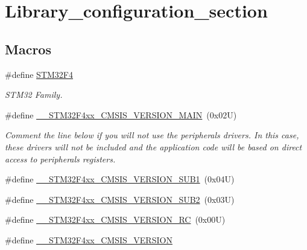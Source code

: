 \hypertarget{group___library__configuration__section}{}\section{Library\+\_\+configuration\+\_\+section}
\label{group___library__configuration__section}
\subsection*{Macros}
\begin{DoxyCompactItemize}
\item 
\#define \hyperlink{group___library__configuration__section_ga84d985cb5667176091597f71ffdb9307}{S\+T\+M32\+F4}
\begin{DoxyCompactList}\small\item\em S\+T\+M32 Family. \end{DoxyCompactList}\item 
\#define \hyperlink{group___library__configuration__section_gaf867da11218022a14245b854f6be6a40}{\+\_\+\+\_\+\+S\+T\+M32\+F4xx\+\_\+\+C\+M\+S\+I\+S\+\_\+\+V\+E\+R\+S\+I\+O\+N\+\_\+\+M\+A\+IN}~(0x02\+U)
\begin{DoxyCompactList}\small\item\em Comment the line below if you will not use the peripherals drivers. In this case, these drivers will not be included and the application code will be based on direct access to peripherals registers. \end{DoxyCompactList}\item 
\#define \hyperlink{group___library__configuration__section_ga4841e20bc5159a594936808c113ae3bc}{\+\_\+\+\_\+\+S\+T\+M32\+F4xx\+\_\+\+C\+M\+S\+I\+S\+\_\+\+V\+E\+R\+S\+I\+O\+N\+\_\+\+S\+U\+B1}~(0x04\+U)
\item 
\#define \hyperlink{group___library__configuration__section_ga6ccbf6336bfb67bf4daeb05eba18a5e3}{\+\_\+\+\_\+\+S\+T\+M32\+F4xx\+\_\+\+C\+M\+S\+I\+S\+\_\+\+V\+E\+R\+S\+I\+O\+N\+\_\+\+S\+U\+B2}~(0x03\+U)
\item 
\#define \hyperlink{group___library__configuration__section_gafbd304f122892833ce0d4daa3dc4ff13}{\+\_\+\+\_\+\+S\+T\+M32\+F4xx\+\_\+\+C\+M\+S\+I\+S\+\_\+\+V\+E\+R\+S\+I\+O\+N\+\_\+\+RC}~(0x00\+U)
\item 
\#define \hyperlink{group___library__configuration__section_ga9e8a65cc42b85335938665a12c37cacf}{\+\_\+\+\_\+\+S\+T\+M32\+F4xx\+\_\+\+C\+M\+S\+I\+S\+\_\+\+V\+E\+R\+S\+I\+ON}
\end{DoxyCompactItemize}


